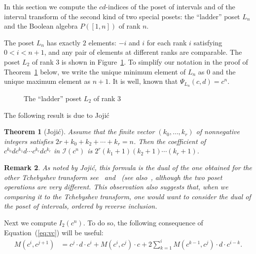 \documentclass[reqno,12pt]{amsart}
\numberwithin{equation}{section}
\newtheorem{theorem}{Theorem}[section]
\newtheorem{remark}[theorem]{Remark}
\newcommand{\0}{\widehat{0}}
\newcommand{\1}{\widehat{1}}
\newcommand{\2}{\widehat{2}}
\newcommand{\II}{I_2}
\newcommand{\Iab}{{\mathcal I}}
\begin{document}
In this section we compute the $cd$-indices of the poset of intervals
and of the interval transform of the second kind of two special posets:  
the ``ladder'' poset $L_n$ and the Boolean algebra $P([1,n])$ of rank $n$. 

The poset $L_n$ has exactly $2$ elements: $-i$ and $i$ for
each rank $i$ satisfying $0<i<n+1$, and any pair of elements at
different ranks are comparable. The poset $L_2$ of rank $3$ is
shown in Figure~\ref{fig:ladder}. To simplify our notation in the proof
of Theorem~\ref{thm:laddercd} below, we write the unique minimum element
of $L_n$ as $0$ and the unique maximum element as $n+1$. It is well,
known that $\Psi_{L_n}(c,d)=c^n$.

\begin{figure}[h]
  
\caption{The ``ladder'' poset $L_2$ of rank $3$}  
\label{fig:ladder}
\end{figure}
The following result is due to Joji\'c~\cite[Theorem 9]{Jojic}
\begin{theorem}[Joji\'{c}]
\label{thm:laddercd}  
Assume that the finite vector  $(k_0,\ldots,k_{r})$ of nonnegative
integers satisfies $2r+k_0+k_2+\cdots+ k_{r}=n$. Then  
the coefficient of $c^{k_0}dc^{k_1} d\cdots c^{k_r}dc^{k_{r}}$ in
$\Iab(c^n)$ is $2^r(k_1+1)(k_2+1)\cdots (k_r+1)$.
\end{theorem}
\begin{remark}
  {\em As noted by Joji\'c, this formula is the dual of the one obtained for the
    other Tchebyshev transform see~\cite[Theorem 7.1]{Hetyei-tch}
    and~\cite[Corollary 6.6]{Ehrenborg-Readdy-Tch} (see also~\cite[Table
      1]{Hetyei-tch}, although
    the two poset operations are very 
    different. This observation also suggests that, when we comparing it 
    to the Tchebyshev transform, one would want to
    consider the dual of the poset of intervals, ordered by reverse
    inclusion.}    
\end{remark}  

Next we compute $\II(c^n)$. To do so, the following consequence of
Equation~(\ref{eq:vc}) will be useful:
\begin{align}
\label{eq:cij+1}
  M(c^i,c^{j+1})&=c^j\cdot d\cdot c^i+M(c^i,c^j)\cdot c
  +2\sum_{k=1}^i M(c^{k-1},c^{j})\cdot d\cdot c^{i-k}.
\end{align}  
\end{document}
